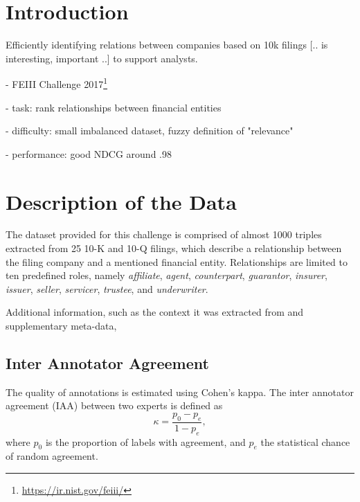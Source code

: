 \section{Introduction}
Efficiently identifying relations between companies based on 10k filings [.. is interesting, important ..] to support analysts.

- FEIII Challenge 2017\footnote{\url{https://ir.nist.gov/feiii/}}

- task: rank relationships between financial entities

- difficulty: small imbalanced dataset, fuzzy definition of "relevance"

- performance: good NDCG around .98


\section{Description of the Data}
The dataset provided for this challenge is comprised of almost 1000 triples extracted from 25 10-K and 10-Q filings, which describe a relationship between the filing company and a mentioned financial entity. Relationships are limited to ten predefined roles, namely \textit{affiliate}, \textit{agent}, \textit{counterpart}, \textit{guarantor}, \textit{insurer}, \textit{issuer}, \textit{seller}, \textit{servicer}, \textit{trustee}, and \textit{underwriter}.

Additional information, such as the context it was extracted from and supplementary meta-data, 

\subsection{Inter Annotator Agreement}
The quality of annotations is estimated using Cohen's kappa. The inter annotator agreement (IAA) between two experts is defined as
$$
\kappa = \frac{p_0-p_e}{1-p_e},
$$
where $p_0$ is the proportion of labels with agreement, and $p_e$ the statistical chance of random agreement.

